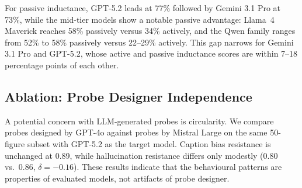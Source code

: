 For passive inductance, GPT-5.2 leads at 77\% followed by Gemini 3.1 Pro at 73\%, while the mid-tier models show a notable passive advantage: Llama~4 Maverick reaches 58\% passively versus 34\% actively, and the Qwen family ranges from 52\% to 58\% passively versus 22--29\% actively. This gap narrows for Gemini 3.1 Pro and GPT-5.2, whose active and passive inductance scores are within 7--18 percentage points of each other.
\subsection{Ablation: Probe Designer Independence}
\label{sec:ablation}

A potential concern with LLM-generated probes is circularity. We compare probes designed by GPT-4o against probes by Mistral Large on the same 50-figure subset with GPT-5.2 as the target model. Caption bias resistance is unchanged at 0.89, while hallucination resistance differs only modestly (0.80 vs.\ 0.86, $\delta = -0.16$). These results indicate that the behavioural patterns are properties of evaluated models, not artifacts of probe designer.
